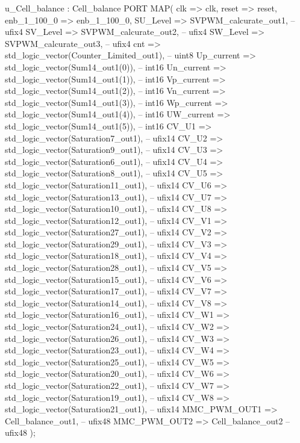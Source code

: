 \begin{mylisting}[language=VHDL,caption=MSSRDCDB制御\&SVPWMモジュール,label=appF_Control_top2_module_VHDL]
  u_Cell_balance : Cell_balance
    PORT MAP( clk => clk,
              reset => reset,
              enb_1_100_0 => enb_1_100_0,
              SU_Level => SVPWM_calcurate_out1,  -- ufix4
              SV_Level => SVPWM_calcurate_out2,  -- ufix4
              SW_Level => SVPWM_calcurate_out3,  -- ufix4
              cnt => std_logic_vector(Counter_Limited_out1),  -- uint8
              Up_current => std_logic_vector(Sum14_out1(0)),  -- int16
              Un_current => std_logic_vector(Sum14_out1(1)),  -- int16
              Vp_current => std_logic_vector(Sum14_out1(2)),  -- int16
              Vn_current => std_logic_vector(Sum14_out1(3)),  -- int16
              Wp_current => std_logic_vector(Sum14_out1(4)),  -- int16
              UW_current => std_logic_vector(Sum14_out1(5)),  -- int16
              CV_U1 => std_logic_vector(Saturation7_out1),  -- ufix14
              CV_U2 => std_logic_vector(Saturation9_out1),  -- ufix14
              CV_U3 => std_logic_vector(Saturation6_out1),  -- ufix14
              CV_U4 => std_logic_vector(Saturation8_out1),  -- ufix14
              CV_U5 => std_logic_vector(Saturation11_out1),  -- ufix14
              CV_U6 => std_logic_vector(Saturation13_out1),  -- ufix14
              CV_U7 => std_logic_vector(Saturation10_out1),  -- ufix14
              CV_U8 => std_logic_vector(Saturation12_out1),  -- ufix14
              CV_V1 => std_logic_vector(Saturation27_out1),  -- ufix14
              CV_V2 => std_logic_vector(Saturation29_out1),  -- ufix14
              CV_V3 => std_logic_vector(Saturation18_out1),  -- ufix14
              CV_V4 => std_logic_vector(Saturation28_out1),  -- ufix14
              CV_V5 => std_logic_vector(Saturation15_out1),  -- ufix14
              CV_V6 => std_logic_vector(Saturation17_out1),  -- ufix14
              CV_V7 => std_logic_vector(Saturation14_out1),  -- ufix14
              CV_V8 => std_logic_vector(Saturation16_out1),  -- ufix14
              CV_W1 => std_logic_vector(Saturation24_out1),  -- ufix14
              CV_W2 => std_logic_vector(Saturation26_out1),  -- ufix14
              CV_W3 => std_logic_vector(Saturation23_out1),  -- ufix14
              CV_W4 => std_logic_vector(Saturation25_out1),  -- ufix14
              CV_W5 => std_logic_vector(Saturation20_out1),  -- ufix14
              CV_W6 => std_logic_vector(Saturation22_out1),  -- ufix14
              CV_W7 => std_logic_vector(Saturation19_out1),  -- ufix14
              CV_W8 => std_logic_vector(Saturation21_out1),  -- ufix14
              MMC_PWM_OUT1 => Cell_balance_out1,  -- ufix48
              MMC_PWM_OUT2 => Cell_balance_out2  -- ufix48
              );


\end{mylisting}
